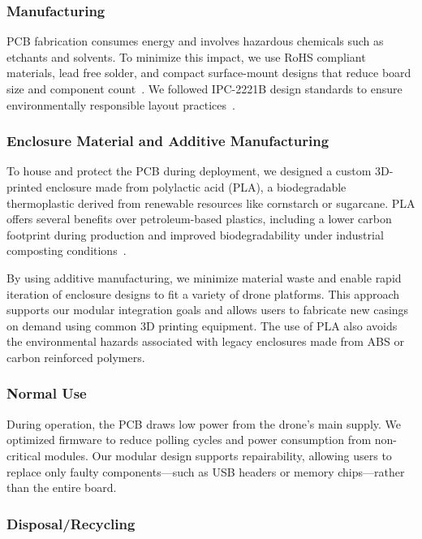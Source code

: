 \documentclass[12pt]{article}
\begin{document}
\subsubsection{Manufacturing}

\par PCB fabrication consumes energy and involves hazardous chemicals such as etchants and solvents. To minimize this impact, we use RoHS compliant materials, lead free solder, and compact surface-mount designs that reduce board size and component count~\cite{ti2023b}. We followed IPC-2221B design standards to ensure environmentally responsible layout practices~\cite{ipc2221b}.

\subsubsection{Enclosure Material and Additive Manufacturing}

\par To house and protect the PCB during deployment, we designed a custom 3D-printed enclosure made from polylactic acid (PLA), a biodegradable thermoplastic derived from renewable resources like cornstarch or sugarcane. PLA offers several benefits over petroleum-based plastics, including a lower carbon footprint during production and improved biodegradability under industrial composting conditions~\cite{pla2023}.

\par By using additive manufacturing, we minimize material waste and enable rapid iteration of enclosure designs to fit a variety of drone platforms. This approach supports our modular integration goals and allows users to fabricate new casings on demand using common 3D printing equipment. The use of PLA also avoids the environmental hazards associated with legacy enclosures made from ABS or carbon reinforced polymers.

\subsubsection{Normal Use}

\par During operation, the PCB draws low power from the drone’s main supply. We optimized firmware to reduce polling cycles and power consumption from non-critical modules. Our modular design supports repairability, allowing users to replace only faulty components—such as USB headers or memory chips—rather than the entire board.

\subsubsection{Disposal/Recycling}
\end{document}
